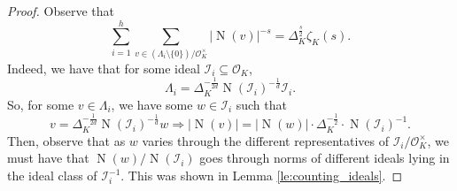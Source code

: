 \documentclass[a4paper]{article}
\theoremstyle{definition}
\theoremstyle{remark}
\DeclareMathOperator{\vol}{vol}
\DeclareMathOperator{\Res}{Res}
\DeclareMathOperator{\N}{N}
\DeclareMathOperator{\Ar}{\widetilde{Cl}}
\newcommand{\OK}{\mathcal{O}_K}
\newcommand{\KR}{K_{\mathbb{R}}}
\begin{document}
\begin{proof}
Observe that 
\begin{equation}
\sum_{i=1}^{h} \sum_{v \in ( \Lambda_{i} \setminus \{0\} )/\OK^{\times}}|\N(v)|^{-s}  = \Delta_K^{\frac{s}{2}} \zeta_K({s}).
\end{equation}
Indeed, we have that for some ideal $\mathcal{I}_{i} \subseteq \OK$, 
\begin{equation}
  \Lambda_i =  \Delta_K^{-\frac{1}{2d}} \N(\mathcal{I}_i)^{-\frac{1}{d}} \mathcal{I}_i.
\end{equation}
So, for some $v \in \Lambda_i$, we have some $w \in \mathcal{I}_i$ such that 
$$v = \Delta_K^{-\frac{1}{2d}} \N(\mathcal{I}_i)^{-\frac{1}{d}}w \Rightarrow |\N(v)| =  |\N(w)| \cdot \Delta_K^{-\frac{1}{2}}  \cdot \N(\mathcal{I}_i)^{-1}.$$
Then, observe that as $w$ varies through the different representatives of $\mathcal{I}_i/\OK^{\times}$, we must have that $\N(w)/ \N(\mathcal{I}_i)$ goes through norms of different ideals lying in the ideal class of $\mathcal{I}_{i}^{-1}$.
This was shown in Lemma \ref{le:counting_ideals}.

\end{proof}
\end{document}
